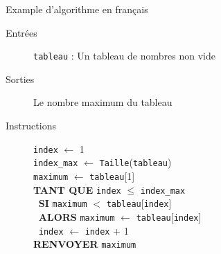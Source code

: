 \begin{frame}{Example d'algorithme en français}
  \begin{description}
    \item [Entrées] \texttt{tableau} : Un tableau de nombres non vide
    \item [Sorties] Le nombre maximum du tableau
    \item [Instructions]
      \texttt{index} $\leftarrow$ 1\\
      \texttt{index\_max} $\leftarrow$ \texttt{Taille}(\texttt{tableau})\\
      \texttt{maximum} $\leftarrow$ \texttt{tableau}[1]\\
      \textbf{TANT QUE} \texttt{index} $\leq$ \texttt{index\_max}\\
      $\;\;$\textbf{SI} \texttt{maximum} $<$ \texttt{tableau}[\texttt{index}]\\
      $\;\;$\textbf{ALORS} \texttt{maximum} $\leftarrow$ \texttt{tableau}[\texttt{index}]\\
      $\;\;$\texttt{index} $\leftarrow$ \texttt{index} + 1\\
      \textbf{RENVOYER} \texttt{maximum}
  \end{description}
\end{frame}

